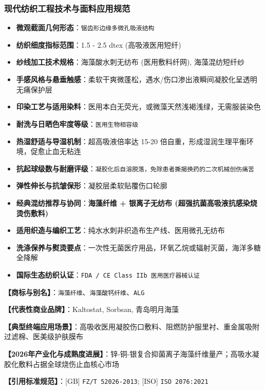 \documentclass[11pt,openright,twoside,UTF8]{ctexbook}
\begin{document}
\subsubsection*{现代纺织工程技术与面料应用规范}
\begin{itemize} \setlength{\itemsep}{2pt}
    \item \textbf{微观截面几何形态}：\texttt{锯齿形边缘多微孔吸液结构}
    \item \textbf{纺织细度指标范围}：1.5 - 2.5 dtex (高吸液医用短纤)
    \item \textbf{纱线加工技术规格}：海藻酸水刺无纺布 (医用敷料纤网), 海藻混纺短纤纱
    \item \textbf{手感风格与悬垂触感}：柔软干爽微蓬松，遇水/伤口渗出液瞬间凝胶化呈透明无痛保护层
    \item \textbf{印染工艺与适用染料}：医用本白无荧光，或微藻天然浅褐浅绿，无需服装染色
    \item \textbf{耐洗与日晒色牢度等级}：\texttt{医用生物相容级}
    \item \textbf{热湿舒适与导湿机制}：超高吸液倍率达 15-20 倍自重，形成湿润生理平衡环境，促愈止血无粘连
    \item \textbf{抗起球级数与耐磨评级}：\texttt{凝胶化后自溶脱落，免除患者撕揭换药的二次机械创伤痛苦}
    \item \textbf{弹性伸长与抗皱保形}：凝胶层柔软贴覆伤口轮廓
    \item \textbf{经典混纺推荐与协同}：\textbf{海藻纤维 + 银离子无纺布 (超强抗菌高吸液抗感染烧烫伤敷料)}
    \item \textbf{适用织造与编织工艺}：纯水水刺非织造布生产线、医用微孔无纺布
    \item \textbf{洗涤保养与熨烫要点}：一次性无菌医疗用品，环氧乙烷或辐射灭菌，海洋多糖全降解
    \item \textbf{国际生态纺织认证}：\texttt{FDA / CE Class IIb 医用医疗器械认证}
\end{itemize}
\vspace{0.2cm}

\noindent\textbf{【商标与别名】}：\texttt{海藻纤维}、\texttt{海藻酸钙纤维}、\texttt{ALG}\par
\noindent\textbf{【代表性商业品牌】}：Kaltostat, Sorbsan, 青岛明月海藻\par
\noindent\textbf{【典型终端应用场景】}：高吸收医用凝胶伤口敷料、阻燃防护服里衬、重金属吸附过滤棉、医美级护肤膜布\par
\noindent\textbf{【2026年产业化与成熟度进展】}：锌-铜-银复合抑菌离子海藻纤维量产；高吸水凝胶化敷料占据全球烧伤止血核心市场\par
\noindent\textbf{【引用标准规范】}：[GB] \texttt{FZ/T 52026-2013}; [ISO] \texttt{ISO 2076:2021}\par
\vspace{0.5cm}
\end{document}
